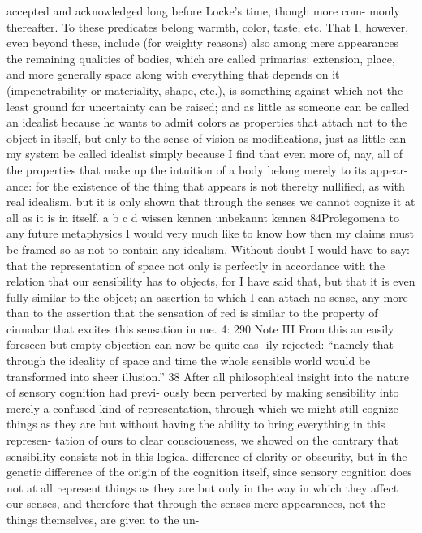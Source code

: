 accepted and acknowledged long before Locke’s time, though more com-
monly thereafter. To these predicates belong warmth, color, taste, etc.
That I, however, even beyond these, include (for weighty reasons) also
among mere appearances the remaining qualities of bodies, which are
called primarias: extension, place, and more generally space along with
everything that depends on it (impenetrability or materiality, shape, etc.),
is something against which not the least ground for uncertainty can be
raised; and as little as someone can be called an idealist because he wants
to admit colors as properties that attach not to the object in itself, but
only to the sense of vision as modiﬁcations, just as little can my system
be called idealist simply because I ﬁnd that even more of, nay, all of the
properties that make up the intuition of a body belong merely to its appear-
ance: for the existence of the thing that appears is not thereby nulliﬁed,
as with real idealism, but it is only shown that through the senses we
cannot cognize it at all as it is in itself.
a
b
c
d
wissen
kennen
unbekannt
kennen
84Prolegomena to any future metaphysics
I would very much like to know how then my claims must be framed
so as not to contain any idealism. Without doubt I would have to say: that
the representation of space not only is perfectly in accordance with the
relation that our sensibility has to objects, for I have said that, but that it
is even fully similar to the object; an assertion to which I can attach no
sense, any more than to the assertion that the sensation of red is similar
to the property of cinnabar that excites this sensation in me.
4: 290
Note III
From this an easily foreseen but empty objection can now be quite eas-
ily rejected: “namely that through the ideality of space and time the
whole sensible world would be transformed into sheer illusion.” 38 After
all philosophical insight into the nature of sensory cognition had previ-
ously been perverted by making sensibility into merely a confused kind
of representation, through which we might still cognize things as they
are but without having the ability to bring everything in this represen-
tation of ours to clear consciousness, we showed on the contrary that
sensibility consists not in this logical difference of clarity or obscurity,
but in the genetic difference of the origin of the cognition itself, since
sensory cognition does not at all represent things as they are but only in
the way in which they affect our senses, and therefore that through the
senses mere appearances, not the things themselves, are given to the un-
